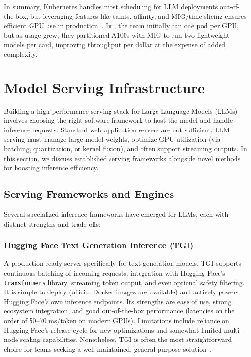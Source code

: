 In summary, Kubernetes handles most scheduling for LLM deployments out-of-the-box, but leveraging features like taints, affinity, and MIG/time-slicing ensures efficient GPU use in production~\cite{nvidia-k8s-device-plugin,nvidia_mig_guide}. In \ishtar{}, the team initially ran one pod per GPU, but as usage grew, they partitioned A100s with MIG to run two lightweight models per card, improving throughput per dollar at the expense of added complexity.


\section{Model Serving Infrastructure}
\label{sec:serving}

Building a high-performance serving stack for Large Language Models (LLMs) involves choosing the right software framework to host the model and handle inference requests. Standard web application servers are not sufficient: LLM serving must manage large model weights, optimize GPU utilization (via batching, quantization, or kernel fusion), and often support streaming outputs. In this section, we discuss established serving frameworks alongside novel methods for boosting inference efficiency.

\subsection{Serving Frameworks and Engines}
\label{sec:serving-fw}

Several specialized inference frameworks have emerged for LLMs, each with distinct strengths and trade-offs:

\subsubsection{Hugging Face Text Generation Inference (TGI)}
A production-ready server specifically for text generation models. TGI supports continuous batching of incoming requests, integration with Hugging Face’s \texttt{transformers} library, streaming token output, and even optional safety filtering. It is simple to deploy (official Docker images are available) and actively powers Hugging Face’s own inference endpoints. Its strengths are ease of use, strong ecosystem integration, and good out-of-the-box performance (latencies on the order of 50--70 ms/token on modern GPUs). Limitations include reliance on Hugging Face’s release cycle for new optimizations and somewhat limited multi-node scaling capabilities. Nonetheless, TGI is often the most straightforward choice for teams seeking a well-maintained, general-purpose solution~\cite{tgi-github,tgi_docs}.

